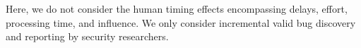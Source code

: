 
Here, we do not consider the human timing effects encompassing delays, effort, processing time, and influence. We only consider incremental valid bug discovery and reporting by security researchers.

